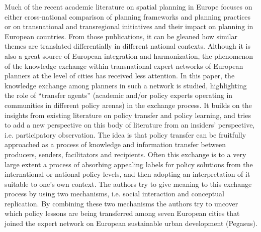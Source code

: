 Much of the recent academic literature on spatial planning in Europe focuses on either cross-national comparison of planning frameworks and planning practices or on transnational and transregional initiatives and their impact on planning in European countries. From those publications, it can be gleaned how similar themes are translated differentially in different national contexts. Although it is also a great source of European integration and harmonization, the phenomenon of the knowledge exchange within transnational expert networks of European planners at the level of cities has received less attention. In this paper, the knowledge exchange among planners in such a network is studied, highlighting the role of “transfer agents” (academic and/or policy experts operating in communities in different policy arenas) in the exchange process. It builds on the insights from existing literature on policy transfer and policy learning, and tries to add a new perspective on this body of literature from an insiders' perspective, i.e. participatory observation. The idea is that policy transfer can be fruitfully approached as a process of knowledge and information transfer between producers, senders, facilitators and recipients. Often this exchange is to a very large extent a process of absorbing appealing labels for policy solutions from the international or national policy levels, and then adopting an interpretation of it suitable to one's own context. The authors try to give meaning to this exchange process by using two mechanisms, i.e. social interaction and conceptual replication. By combining these two mechanisms the authors try to uncover which policy lessons are being transferred among seven European cities that joined the expert network on European sustainable urban development (Pegasus).
